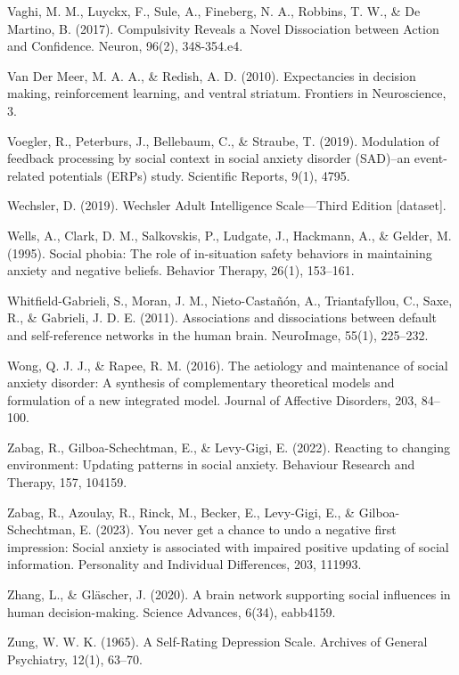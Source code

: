 \documentclass[12pt,a4paper,oneside,]{book} %
\begin{document}
Vaghi, M. M., Luyckx, F., Sule, A., Fineberg, N. A., Robbins, T. W., \& De Martino, B. (2017). Compulsivity Reveals a Novel Dissociation between Action and Confidence. Neuron, 96(2), 348-354.e4.

Van Der Meer, M. A. A., \& Redish, A. D. (2010). Expectancies in decision making, reinforcement learning, and ventral striatum. Frontiers in Neuroscience, 3.

Voegler, R., Peterburs, J., Bellebaum, C., \& Straube, T. (2019). Modulation of feedback processing by social context in social anxiety disorder (SAD)--an event-related potentials (ERPs) study. Scientific Reports, 9(1), 4795.

Wechsler, D. (2019). Wechsler Adult Intelligence Scale---Third Edition {[}dataset{]}.

Wells, A., Clark, D. M., Salkovskis, P., Ludgate, J., Hackmann, A., \& Gelder, M. (1995). Social phobia: The role of in-situation safety behaviors in maintaining anxiety and negative beliefs. Behavior Therapy, 26(1), 153--161.

Whitfield-Gabrieli, S., Moran, J. M., Nieto-Castañón, A., Triantafyllou, C., Saxe, R., \& Gabrieli, J. D. E. (2011). Associations and dissociations between default and self-reference networks in the human brain. NeuroImage, 55(1), 225--232.

Wong, Q. J. J., \& Rapee, R. M. (2016). The aetiology and maintenance of social anxiety disorder: A synthesis of complementary theoretical models and formulation of a new integrated model. Journal of Affective Disorders, 203, 84--100.

Zabag, R., Gilboa-Schechtman, E., \& Levy-Gigi, E. (2022). Reacting to changing environment: Updating patterns in social anxiety. Behaviour Research and Therapy, 157, 104159.

Zabag, R., Azoulay, R., Rinck, M., Becker, E., Levy-Gigi, E., \& Gilboa-Schechtman, E. (2023). You never get a chance to undo a negative first impression: Social anxiety is associated with impaired positive updating of social information. Personality and Individual Differences, 203, 111993.

Zhang, L., \& Gläscher, J. (2020). A brain network supporting social influences in human decision-making. Science Advances, 6(34), eabb4159.

Zung, W. W. K. (1965). A Self-Rating Depression Scale. Archives of General Psychiatry, 12(1), 63--70.

\backmatter
\end{document}
